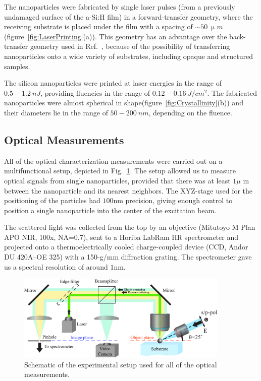                 The nanoparticles were fabricated by single laser pulses (from a previously undamaged surface of the a-Si:H film) in a
            forward-transfer geometry, where the receiving substrate is placed under the film with a spacing
            of $\sim 50~\si{\upmu m}$ (figure~\ref{fig:LaserPrinting}(a)). This geometry has an advantage over the back-transfer geometry
            used in Ref.~\cite{zywietz2014laser}, because of the possibility of transferring nanoparticles onto a wide variety of substrates,
            including opaque and structured samples.

                The silicon nanoparticles were printed at laser energies in the range of $0.5-1.2~\si{nJ}$, providing fluencies in
            the range of $0.12-0.16~\si{J/cm^{2}}$. The fabricated nanoparticles were almost spherical in shape(figure~\ref{fig:Crystallinity}(b))
            and their diameters lie in the range of $50-200~\si{nm}$, depending on the fluence.

    \clearpage
    \subsection{Optical Measurements}
            All of the optical characterization measurements were carried out on a multifunctional setup, depicted in
            Fig.~\ref{fig:expSetup}. The setup allowed us to measure optical signals from single nanoparticles, provided that
            there was at least $1\mu$ m between the nanoparticle and its nearest neighbors. The XYZ-stage used for the
            positioning of the particles had $100$nm precision, giving enough control to position a single nanoparticle into
            the center of the excitation beam.

            The scattered light was collected from the top by an objective (Mitutoyo M Plan APO NIR, 100x, NA=0.7),
            sent to a Horiba LabRam HR spectrometer and projected onto a thermoelectrically cooled charge-coupled device
            (CCD, Andor DU 420A--OE 325) with a 150-g/mm diffraction grating. The spectrometer gave us a spectral resolution
            of around $1$nm.

            \begin{figure}[!ht]
                    \begin{center}
                        \includegraphics[width=0.9\textwidth]{figs/methods/expSetup2.eps}
                    \end{center}
                    \caption{Schematic of the experimental setup used for all of the optical measurements.}
                    \label{fig:expSetup}
            \end{figure}

